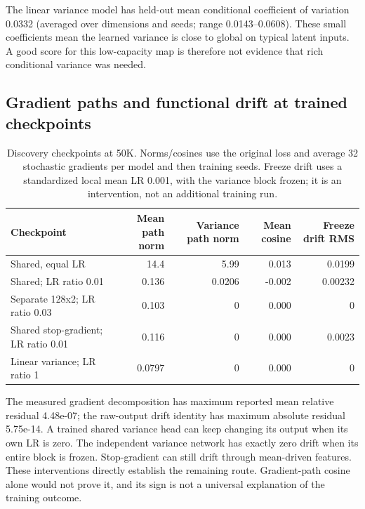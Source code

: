 \documentclass[11pt,a4paper]{article}
\begin{document}
The linear variance model has held-out mean conditional coefficient of variation 0.0332 (averaged over dimensions and seeds; range 0.0143--0.0608). These small coefficients mean the learned variance is close to global on typical latent inputs. A good score for this low-capacity map is therefore not evidence that rich conditional variance was needed.

\subsection{Gradient paths and functional drift at trained checkpoints}
\begin{table}[H]\centering\small
\caption{Discovery checkpoints at 50K. Norms/cosines use the original loss and average 32 stochastic gradients per model and then training seeds. Freeze drift uses a standardized local mean LR 0.001, with the variance block frozen; it is an intervention, not an additional training run.}
\begin{tabular}{@{}>{\raggedright\arraybackslash}p{4.4cm}rrrr@{}}
\toprule
Checkpoint & Mean path norm & Variance path norm & Mean cosine & Freeze drift RMS \\ \midrule
Shared, equal LR & 14.4 & 5.99 & 0.013 & 0.0199 \\
Shared; LR ratio 0.01 & 0.136 & 0.0206 & -0.002 & 0.00232 \\
Separate 128x2; LR ratio 0.03 & 0.103 & 0 & 0.000 & 0 \\
Shared stop-gradient; LR ratio 0.01 & 0.116 & 0 & 0.000 & 0.0023 \\
Linear variance; LR ratio 1 & 0.0797 & 0 & 0.000 & 0 \\
\bottomrule\end{tabular}\end{table}
The measured gradient decomposition has maximum reported mean relative residual 4.48e-07; the raw-output drift identity has maximum absolute residual 5.75e-14. A trained shared variance head can keep changing its output when its own LR is zero. The independent variance network has exactly zero drift when its entire block is frozen. Stop-gradient can still drift through mean-driven features. These interventions directly establish the remaining route. Gradient-path cosine alone would not prove it, and its sign is not a universal explanation of the training outcome.
\end{document}
